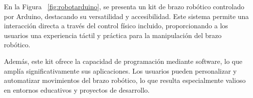 En la Figura ~\ref{fig:robotarduino}, se presenta un kit de brazo robótico controlado por Arduino, destacando su versatilidad y accesibilidad. Este sistema permite una interacción directa a través del control físico incluido, proporcionando a los usuarios una experiencia táctil y práctica para la manipulación del brazo robótico.

Además, este kit ofrece la capacidad de programación mediante software, lo que amplía significativamente sus aplicaciones. Los usuarios pueden personalizar y automatizar movimientos del brazo robótico, lo que resulta especialmente valioso en entornos educativos y proyectos de desarrollo.